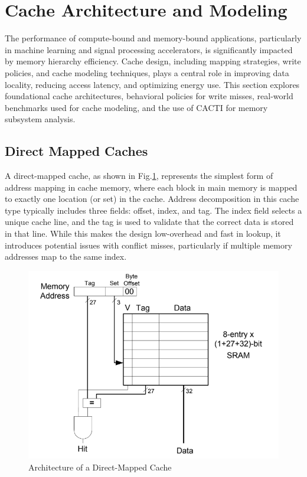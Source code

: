 
\section{Cache Architecture and Modeling}
The performance of compute-bound and memory-bound applications, particularly in machine learning and signal processing accelerators, is significantly impacted by memory hierarchy efficiency. Cache design, including mapping strategies, write policies, and cache modeling techniques, plays a central role in improving data locality, reducing access latency, and optimizing energy use. This section explores foundational cache architectures, behavioral policies for write misses, real-world benchmarks used for cache modeling, and the use of CACTI for memory subsystem analysis.

\subsection{Direct Mapped Caches}
A direct-mapped cache, as shown in Fig.\ref{fig:direct-mapped-cache-arch}, represents the simplest form of address mapping in cache memory, where each block in main memory is mapped to exactly one location (or set) in the cache. Address decomposition in this cache type typically includes three fields: offset, index, and tag. The index field selects a unique cache line, and the tag is used to validate that the correct data is stored in that line. While this makes the design low-overhead and fast in lookup, it introduces potential issues with conflict misses, particularly if multiple memory addresses map to the same index\cite{cache-1}.

\begin{figure}
	\centerline{\includegraphics[scale = 0.6]{Figures/direct_mapped_cache_architecture.png}}
	\caption{Architecture of a Direct-Mapped Cache}
	\label{fig:direct-mapped-cache-arch}
\end{figure}

